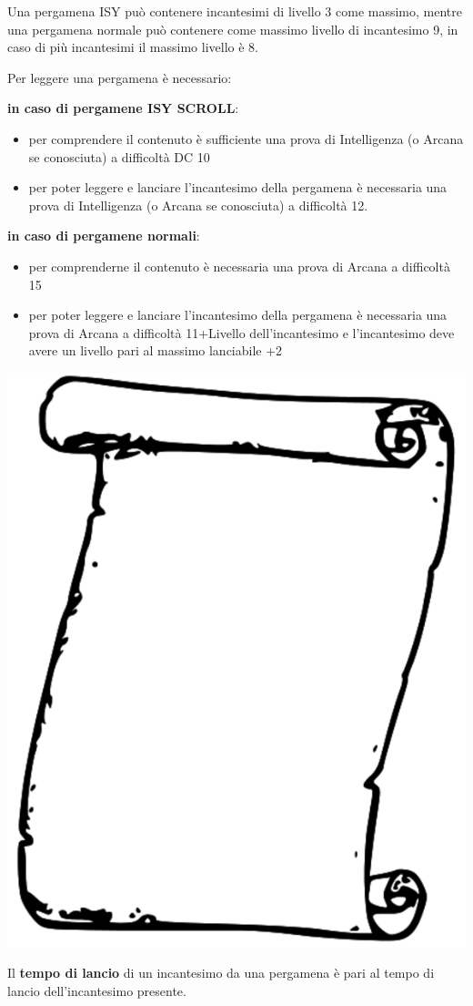 \begin{multicols}{2}
Una pergamena ISY può contenere incantesimi di livello 3 come massimo, mentre una pergamena normale può contenere come massimo livello di incantesimo 9, in caso di più incantesimi il massimo livello è 8.

\medskip

Per leggere una pergamena è necessario:\label{leggerepergamena}

\medskip

\textbf{in caso di pergamene ISY SCROLL}:

\begin{itemize}[leftmargin=*] \setlength{\itemsep}{0pt}
\item per comprendere il contenuto è sufficiente una prova di Intelligenza (o Arcana se conosciuta) a difficoltà DC 10
\item per poter leggere e lanciare l'incantesimo della pergamena è necessaria una prova di Intelligenza (o Arcana se conosciuta) a difficoltà 12.
\end{itemize}

\textbf{in caso di pergamene normali}:

\begin{itemize}[leftmargin=*] \setlength{\itemsep}{0pt}
\item per comprenderne il contenuto è necessaria una prova di Arcana a difficoltà 15
\item per poter leggere e lanciare l'incantesimo della pergamena è necessaria una prova di Arcana a difficoltà 11+Livello dell'incantesimo e l'incantesimo deve avere un livello pari al massimo lanciabile +2
\end{itemize}

\begin{center}
\includegraphics[width=0.4\linewidth]{immagini/scroll3.png}
\end{center}

Il \textbf{tempo di lancio} di un incantesimo da una pergamena è pari al tempo di lancio dell'incantesimo presente.


\end{multicols}
